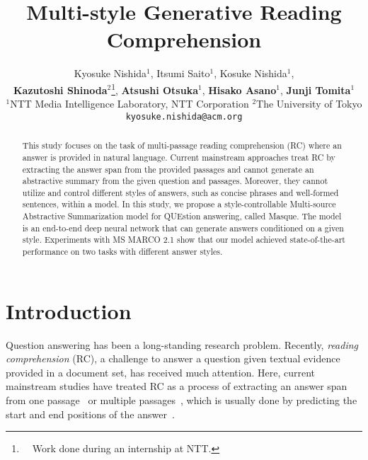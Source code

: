 \documentclass[11pt,a4paper]{article}
\theoremstyle{mydef}
\theoremstyle{myprob}
\begin{document}
\title{Multi-style Generative Reading Comprehension}

\author{Kyosuke Nishida$^1$, 
Itsumi Saito$^1$, 
Kosuke Nishida$^1$, 
\\{\bf Kazutoshi Shinoda}$^2$\thanks{\ \ Work done during an internship at NTT.}, 
{\bf Atsushi Otsuka}$^1$,
{\bf Hisako Asano}$^1$, 
{\bf Junji Tomita}$^1$\\
  $^1$NTT Media Intelligence Laboratory, NTT Corporation \hspace{1.5em}  $^2$The University of Tokyo\\
  {\tt kyosuke.nishida@acm.org}
}

\date{}

\maketitle
\begin{abstract}
This study focuses on the task of multi-passage reading comprehension (RC) where an answer is provided in natural language. Current mainstream approaches treat RC by extracting the answer span from the provided passages and cannot generate an abstractive summary from the given question and passages. Moreover, they cannot utilize and control different styles of answers, such as concise phrases and well-formed sentences, within a model. 
In this study, we propose a style-controllable Multi-source Abstractive Summarization model for QUEstion answering, called Masque. The model is an end-to-end deep neural network that can generate answers conditioned on a given style. 
Experiments with MS MARCO 2.1 show that our model achieved state-of-the-art performance %
on two tasks with different answer styles.
\end{abstract}

\section{Introduction}
\label{sec:intro}

Question answering has been a long-standing research problem. Recently, \textit{reading comprehension} (RC), a challenge to answer a question given textual evidence provided in a document set, has received much attention. Here, current mainstream studies have treated RC as a process of extracting an answer span from one passage~\citep{RajpurkarZLL16,RajpurkarJL18} or multiple passages~\citep{JoshiCWZ17}, which is usually done by predicting the start and end positions of the answer~\citep{Yu18,DevlinCLT18}.
\end{document}
